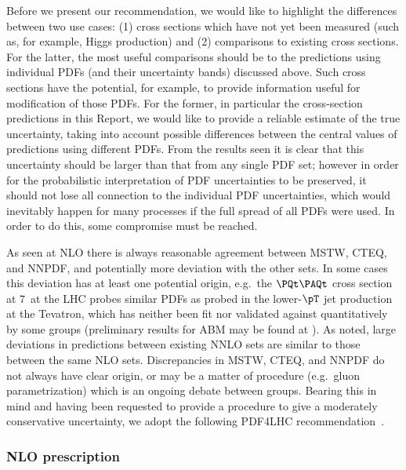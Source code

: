 Before we present our recommendation, we would like to highlight the
differences between two use cases: (1) cross sections which have not
yet been measured (such as, for example, Higgs production) and (2)
comparisons to existing cross sections. For the latter, the most
useful comparisons should be to the predictions using individual PDFs
(and their uncertainty bands) discussed above. Such cross sections
have the potential, for example, to provide information useful for
modification of those PDFs. For the former, in particular the 
cross-section predictions in this Report, we would like to provide a
reliable estimate of the true uncertainty, taking into account
possible differences between the central values of predictions using
different PDFs. From the results seen it is clear that this
uncertainty should be larger than that from any single PDF set; however
in order for the probabilistic interpretation of PDF uncertainties to
be preserved, it should not lose all connection to the individual PDF
uncertainties, which would inevitably happen for many processes if the full
spread of all PDFs were used. In order to do this,  
some compromise must be  reached.  


As seen at NLO there is always reasonable agreement
between MSTW, CTEQ, and NNPDF, and potentially more deviation with the other 
sets. In some cases this deviation has at least one potential origin,
 e.g.\ the $\PQt\PAQt$ 
cross section at $7$\UTeV\ at the LHC probes similar PDFs as probed in
 the lower-$\pT$ 
jet production at the Tevatron, which has neither been fit nor validated 
against quantitatively by some groups (preliminary results for ABM may be 
found at ). As noted, large deviations 
in predictions between 
existing NNLO sets are similar to those between the same NLO sets.
Discrepancies in MSTW, CTEQ, and NNPDF
do not always have clear origin, or may be a matter of procedure (e.g.\ gluon 
parametrization) which is an ongoing debate between groups. Bearing this in 
mind and having been requested to provide a procedure to give a moderately 
conservative uncertainty, we adopt the following
PDF4LHC recommendation~\cite{PDF4LHCwebpage}. 

\subsubsection{NLO prescription}

